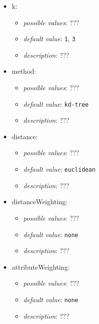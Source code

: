 \documentclass{article}
\begin{document}
\begin{itemize}
    \item k:
           \begin{itemize}
                \item \emph{possible values}: ???
                \item \emph{default value}: \texttt{1}, \texttt{3}
                \item \emph{description}: ???
           \end{itemize}
    \item method:
           \begin{itemize}
                \item \emph{possible values}: ???
                \item \emph{default value}: \texttt{kd-tree}
                \item \emph{description}: ???
           \end{itemize}
    \item distance:
           \begin{itemize}
                \item \emph{possible values}: ???
                \item \emph{default value}: \texttt{euclidean}
                \item \emph{description}: ???
           \end{itemize}
    \item distanceWeighting:
           \begin{itemize}
                \item \emph{possible values}: ???
                \item \emph{default value}: \texttt{none}
                \item \emph{description}: ???
           \end{itemize}
    \item attributeWeighting:
           \begin{itemize}
                \item \emph{possible values}: ???
                \item \emph{default value}: \texttt{none}
                \item \emph{description}: ???
           \end{itemize}
\end{itemize}
\end{document}
